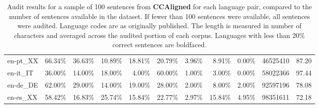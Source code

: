 \begin{table*}[hbt!]
{\begin{tabular}{l|rrrr|rrrr|rr}
            en-pt\_XX               & 66.34\% & 36.63\% & 10.89\% & 18.81\% & 20.79\% & 3.96\%  & 8.91\%  & 0.00\%  & 46525410    & 87.20             \\
            en-it\_IT               & 36.00\% & 14.00\% & 18.00\% & 4.00\%  & 60.00\% & 1.00\%  & 3.00\%  & 0.00\%  & 58022366    & 97.44             \\
            en-de\_DE               & 62.00\% & 29.00\% & 14.00\% & 19.00\% & 28.00\% & 2.00\%  & 8.00\%  & 2.00\%  & 92597196    & 78.08             \\
            en-es\_XX               & 58.42\% & 16.83\% & 25.74\% & 15.84\% & 22.77\% & 2.97\%  & 15.84\% & 4.95\%  & 98351611    & 72.18             \\
            \bottomrule
        \end{tabular}%
    }
    \caption{Audit results for a sample of 100 sentences from \textbf{CCAligned} for each language pair, compared to the number of sentences available in the dataset. If fewer than 100 sentences were available, all sentences were audited. Language codes are as originally published.  The length is measured in number of characters and averaged across the audited portion of each corpus. Languages with less than 20\% correct sentences are boldfaced.}

    \label{tab:ccaligned-full}
\end{table*}


\clearpage

